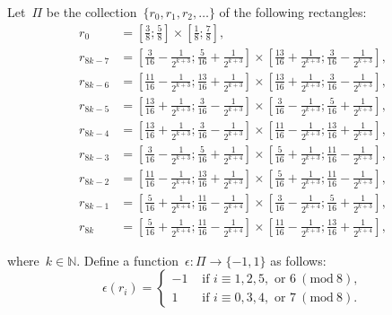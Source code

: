 \documentclass{amsart}
\theoremstyle{theorem}
\theoremstyle{remark}
\theoremstyle{definition}
\numberwithin{equation}{section}
\numberwithin{figure}{section}
\begin{document}
Let~$\Pi$ be the collection~$\{r_0,r_1,r_2,\ldots\}$ of the following rectangles:
\begin{align*}
    r_0 &= \left[\frac38; \frac58\right] \times\left[\frac18; \frac78\right],\\
    r_{8k-7} &= \left[\frac{3}{16} - \frac{1}{2^{k + 3}}; \frac{5}{16} + \frac{1}{2^{k + 3}}\right] \times\left[\frac{13}{16} + \frac{1}{2^{k + 3}}; \frac{3}{16} - \frac{1}{2^{k + 3}}\right],\\
    r_{8k-6} &= \left[\frac{11}{16} - \frac{1}{2^{k + 3}}; \frac{13}{16} + \frac{1}{2^{k + 3}}\right] \times\left[\frac{13}{16} + \frac{1}{2^{k + 3}}; \frac{3}{16} - \frac{1}{2^{k + 3}}\right],\\
    r_{8k-5} &= \left[\frac{13}{16} + \frac{1}{2^{k + 3}}; \frac{3}{16} - \frac{1}{2^{k + 3}}\right] \times\left[\frac{3}{16} - \frac{1}{2^{k + 3}}; \frac{5}{16} + \frac{1}{2^{k + 3}}\right],\\
    r_{8k-4} &= \left[\frac{13}{16} + \frac{1}{2^{k + 3}}; \frac{3}{16} - \frac{1}{2^{k + 3}}\right] \times\left[\frac{11}{16} - \frac{1}{2^{k + 3}}; \frac{13}{16} + \frac{1}{2^{k + 3}}\right],\\
    r_{8k-3} &= \left[\frac{3}{16} - \frac{1}{2^{k + 3}}; \frac{5}{16} + \frac{1}{2^{k + 4}}\right] \times\left[\frac{5}{16} + \frac{1}{2^{k + 3}}; \frac{11}{16} - \frac{1}{2^{k + 3}}\right],\\
    r_{8k-2} &= \left[\frac{11}{16} - \frac{1}{2^{k + 4}}; \frac{13}{16} + \frac{1}{2^{k + 3}}\right] \times\left[\frac{5}{16} + \frac{1}{2^{k + 3}}; \frac{11}{16} - \frac{1}{2^{k + 3}}\right],\\
    r_{8k-1} &= \left[\frac{5}{16} + \frac{1}{2^{k + 4}}; \frac{11}{16} - \frac{1}{2^{k + 4}}\right] \times\left[\frac{3}{16} - \frac{1}{2^{k + 4}}; \frac{5}{16} + \frac{1}{2^{k + 3}}\right],\\
    r_{8k}   &= \left[\frac{5}{16} + \frac{1}{2^{k + 4}}; \frac{11}{16} - \frac{1}{2^{k + 4}}\right] \times\left[\frac{11}{16} - \frac{1}{2^{k + 3}}; \frac{13}{16} + \frac{1}{2^{k + 4}}\right],
\end{align*}

where~$k\in\mathbb N$.
    Define a function~$\epsilon:\Pi\rightarrow\{-1,1\}$ as follows:
    \begin{equation*}
    \epsilon(r_i) = \left\{
        \begin{aligned}
            -1& \text{ if } i\equiv 1,2,5,\text{ or }6\ (\mathrm{mod}\ 8),\\
            1& \text{ if } i\equiv 0,3,4,\text{ or }7\ (\mathrm{mod}\ 8).
        \end{aligned}
    \right.
    \end{equation*}
    
\end{document}
